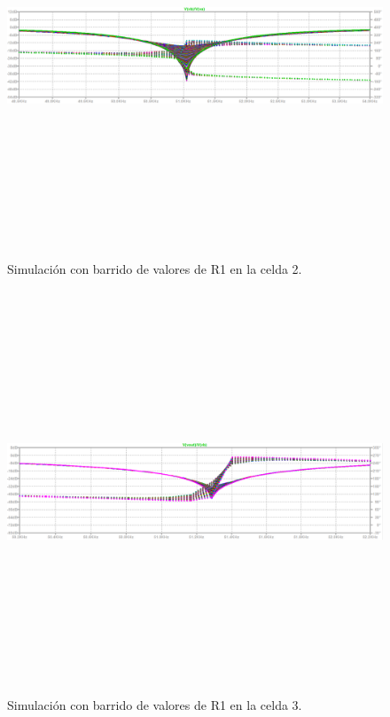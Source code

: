 \begin{figure}[H] %
	\centering	\includegraphics[width=12cm,height=12cm,keepaspectratio]{../EJ4/graficos/etapa2_R1cambiada.png}
	\caption{Simulaci\'on con barrido de valores de R1 en la celda 2.}
	\label{celda2_r1}
\end{figure}

\begin{figure}[H] %
	\centering	\includegraphics[width=12cm,height=12cm,keepaspectratio]{../EJ4/graficos/etapa3_R1.png}
	\caption{Simulaci\'on con barrido de valores de R1 en la celda 3.}
	\label{celda3_r1}
\end{figure}

